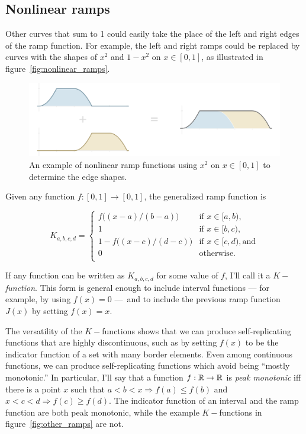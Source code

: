 \documentclass[]{article}
\begin{document}
\subsection{Nonlinear ramps}\label{sec:nonlinearux5framps}

Other curves that sum to 1 could easily take the place of the left and
right edges of the ramp function. For example, the left and right ramps
could be replaced by curves with the shapes of \(x^2\) and \(1-x^2\) on
\(x\in [0, 1]\), as illustrated in figure~\ref{fig:nonlinear_ramps}.

\begin{figure}[htbp]
\centering
\includegraphics{images/pdfs/nonlinear_ramps2.pdf}
\caption{\label{fig:nonlinear_ramps}An example of nonlinear ramp
functions using \(x^2\) on \(x\in [0, 1]\) to determine the edge
shapes.}\label{fig:nonlinearux5framps}
\end{figure}

Given any function \(f:[0,1]\to [0,1]\), the generalized ramp function
is

\[ K_{a,b,c,d} = \begin{cases}
f\big((x - a) / (b - a)\big) & \text{if } x \in [a, b), \\
1 & \text{if } x \in [b, c), \\
1 - f\big((x - c) / (d - c)\big) & \text{if } x \in [c, d), \text{and} \\
0 & \text{otherwise.} \\
\end{cases}\]

If any function can be written as \(K_{a,b,c,d}\) for some value of
\(f\), I'll call it a \(K-\)\emph{function}. This form is general enough
to include interval functions --- for example, by using \(f(x) = 0\)
---~and to include the previous ramp function \(J(x)\) by setting
\(f(x)=x\).

The versatility of the \(K-\)functions shows that we can produce
self-replicating functions that are highly discontinuous, such as by
setting \(f(x)\) to be the indicator function of a set with many border
elements. Even among continuous functions, we can produce
self-replicating functions which avoid being ``mostly monotonic.'' In
particular, I'll say that a function \(f:\mathbb{R}\to\mathbb{R}\) is \emph{peak
monotonic} iff there is a point \(x\) such that
\(a < b < x \Rightarrow f(a) \le f(b)\) and
\(x < c < d \Rightarrow f(c) \ge f(d)\). The indicator function of an
interval and the ramp function are both peak monotonic, while the
example \(K-\)functions in figure~\ref{fig:other_ramps} are not.
\end{document}
